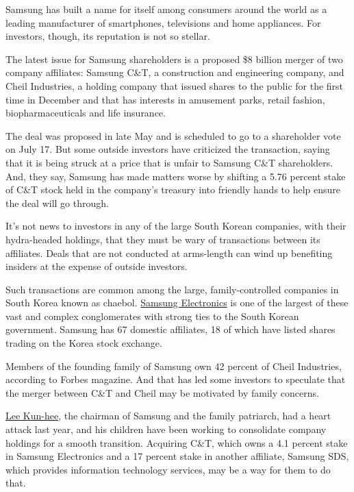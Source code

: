 Samsung has built a name for itself among consumers around the world as
a leading manufacturer of smartphones, televisions and home appliances.
For investors, though, its reputation is not so stellar.

The latest issue for Samsung shareholders is a proposed \$8 billion
merger of two company affiliates: Samsung C\&T, a construction and
engineering company, and Cheil Industries, a holding company that issued
shares to the public for the first time in December and that has
interests in amusement parks, retail fashion, biopharmaceuticals and
life insurance.

The deal was proposed in late May and is scheduled to go to a
shareholder vote on July 17. But some outside investors have criticized
the transaction, saying that it is being struck at a price that is
unfair to Samsung C\&T shareholders. And, they say, Samsung has made
matters worse by shifting a 5.76 percent stake of C\&T stock held in the
company's treasury into friendly hands to help ensure the deal will go
through.

It's not news to investors in any of the large South Korean companies,
with their hydra-headed holdings, that they must be wary of transactions
between its affiliates. Deals that are not conducted at arms-length can
wind up benefiting insiders at the expense of outside investors.

Such transactions are common among the large, family-controlled
companies in South Korea known as chaebol.
\href{http://www.samsung.com/us/aboutsamsung/investor_relations/financial_information/downloads/2015/2015_business_quarter01.pdf}{Samsung
Electronics} is one of the largest of these vast and complex
conglomerates with strong ties to the South Korean government. Samsung
has 67 domestic affiliates, 18 of which have listed shares trading on
the Korea stock exchange.

Members of the founding family of Samsung own 42 percent of Cheil
Industries, according to Forbes magazine. And that has led some
investors to speculate that the merger between C\&T and Cheil may be
motivated by family concerns.

\href{http://www.forbes.com/profile/lee-kun-hee/}{Lee Kun-hee}, the
chairman of Samsung and the family patriarch, had a heart attack last
year, and his children have been working to consolidate company holdings
for a smooth transition. Acquiring C\&T, which owns a 4.1 percent stake
in Samsung Electronics and a 17 percent stake in another affiliate,
Samsung SDS, which provides information technology services, may be a
way for them to do that.

